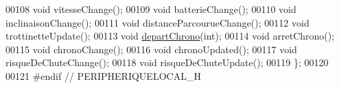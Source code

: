 \begin{DoxyCode}
00108     \textcolor{keywordtype}{void} vitesseChange();
00109     \textcolor{keywordtype}{void} batterieChange(); 
00110     \textcolor{keywordtype}{void} inclinaisonChange();
00111     \textcolor{keywordtype}{void} distanceParcourueChange();
00112     \textcolor{keywordtype}{void} trottinetteUpdate();
00113     \textcolor{keywordtype}{void} \hyperlink{class_peripherique_local_a8c29d255e41df4bc381f4ff2d1451416}{departChrono}(\textcolor{keywordtype}{int}); 
00114     \textcolor{keywordtype}{void} arretChrono(); 
00115     \textcolor{keywordtype}{void} chronoChange(); 
00116     \textcolor{keywordtype}{void} chronoUpdated();
00117     \textcolor{keywordtype}{void} risqueDeChuteChange();
00118     \textcolor{keywordtype}{void} risqueDeChuteUpdate();
00119 \};
00120 
00121 \textcolor{preprocessor}{#endif // PERIPHERIQUELOCAL\_H}
\end{DoxyCode}
